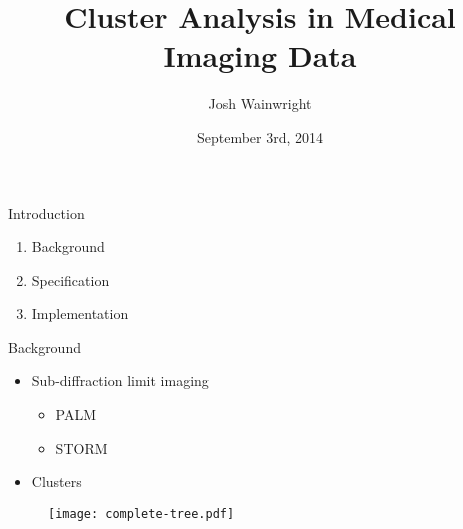 \documentclass{beamer}
\title{Cluster Analysis in Medical Imaging Data}
\author{Josh Wainwright}
\institute{Iain Styles}
\date{September 3rd, 2014}
\begin{document}
\graphicspath{ {images/} }

\begin{frame}
\titlepage%
\end{frame}

\begin{frame}{Introduction}
	\begin{enumerate}
		\item Background
		\item Specification
		\item Implementation
	\end{enumerate}
\end{frame}

\begin{frame}{Background}
	\begin{itemize}
		\item Sub-diffraction limit imaging
			\begin{itemize}
				\item PALM
				\item STORM
			\end{itemize}
		\item Clusters
	\end{itemize}
\end{frame}

\begin{frame}
	\begin{figure}
		\texttt{[image: complete-tree.pdf]}
	\end{figure}
\end{frame}

\begin{frame}
\end{frame}
\end{document}
